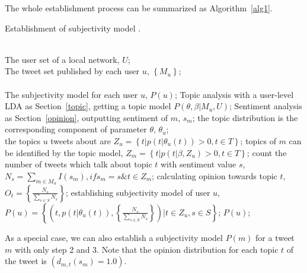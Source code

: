 \documentclass{acm_proc_article-sp}
\begin{document}
The whole establishment process can be summarized as Algorithm~\ref{alg1}.

\begin{algorithm}[htb] 
\caption{ Establishment of subjectivity model .} 
\label{alg1}
\begin{algorithmic}[1] %
\REQUIRE ~~\\ %
The user set of a local network, $ U $;\\
The tweet set published by each user $ u $, $ \left\{ M_{u} \right\}$;\\
\ENSURE ~~\\ %
The subjectivity model for each user $ u $, $ P(u) $;
\STATE Topic analysis with a user-level LDA as Section~\ref{topic}, getting a topic model $P(\theta,\beta|M_{u},U)$; 
\label{ alg1:topic }%
\label{alg1:sentiment}
\STATE Sentiment analysis as Section~\ref{opinion}, outputting sentiment of $ m $, $ s_{m} $;
\ENDFOR
{}
\STATE the topic distribution is the corresponding component of parameter $ \theta $, $ \theta_{u} $; \\
\STATE the topics $ u $ tweets about are $ Z_{u}= \left\lbrace t \vert p\left( t \vert \theta_{u}(t) \right)>0, t \in T \right\rbrace $; 
\ENDFOR
{}
\STATE topics of $ m $ can be identified by the topic model, $ Z_{m} =\left\lbrace t \vert p\left( t \vert \beta, Z_{u} \right)>0, t \in T \right\rbrace $; 
\ENDFOR
{}
\STATE count the number of tweets which talk about topic $ t $ with sentiment value $ s $, $ N_{s}=\sum_{m \in M_{u}} I\left( s_{m} \right) ,  if  s_{m}=s \& t \in Z_{m} $; 
\ENDFOR
\STATE calculating opinion towards topic $ t $, $  O_{t} = \left\{ \frac{N_{s}}{\sum_{s \in S} N_{s}} \right\} $;
\ENDFOR
\STATE establishing subjectivity model of user $ u $, $ P\left( u \right)= \left\lbrace \left( t, p\left( t \vert \theta_{u}(t) \right), \left\{ \frac{N_{s}}{\sum_{s \in S} N_{s}} \right\}  \right)  \vert t \in Z_{u}, s \in S  \right\rbrace   $;
\label{subuser}
\RETURN $P(u)$; %
\end{algorithmic}
\end{algorithm}

As a special case, we can also establish a subjectivity model $ P\left( m \right)  $ for a tweet $ m $ with only step 2 and 3. Note that the opinion distribution for each topic $ t $ of the tweet is $(d_{m,t}\left( s_{m}\right)= 1.0 )$. 
\end{document}
